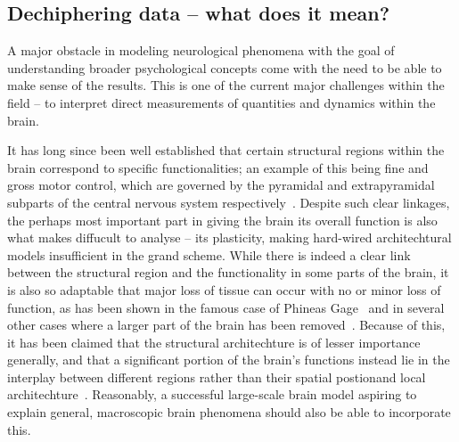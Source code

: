 \documentclass[10pt]{article}\usepackage[]{graphicx}\usepackage[]{color}
\theoremstyle{plain}
\begin{document}
\begin{multicols*}{2}
	\subsection*{Dechiphering data -- what does it mean?}
	A major obstacle in modeling neurological phenomena with the goal of understanding broader psychological concepts come with the need to be able to make sense of the results. This is one of the current major challenges within the field -- to interpret direct measurements of quantities and dynamics within the brain. 
	
	It has long since been well established that certain structural regions within the brain correspond to specific functionalities; an example of this being fine and gross motor control, which are governed by the pyramidal and extrapyramidal subparts of the central nervous system respectively~\cite{guyton2006textbook}. Despite such clear linkages, the perhaps most important part in giving the brain its overall function is also what makes diffucult to analyse -- its plasticity, making hard-wired architechtural models insufficient in the grand scheme. While there is indeed a clear link between the structural region and the functionality in some parts of the brain, it is also so adaptable that major loss of tissue can occur with no or minor loss of function, as has been shown in the famous case of Phineas Gage~\cite{damasio1994return} and in several other cases where a larger part of the brain has been removed~\cite{kolb1998brain,bach1990brain,rauschecker1995compensatory}. Because of this, it has been claimed that the structural architechture is of lesser importance generally, and that a significant portion of the brain's functions instead lie in the interplay between different regions rather than their spatial postionand local architechture~\cite{chua1995schizophrenia,park2013structural}. Reasonably, a successful large-scale brain model aspiring to explain general, macroscopic brain phenomena should also be able to incorporate this.
					          

\end{multicols*}
\end{document}
